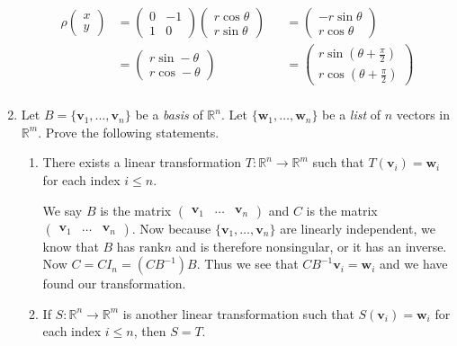 \documentclass[letterpaper]{article}
\newcommand{\rank}{\text{rank}}
\begin{document}
\begin{enumerate}
\begin{align*}
  \rho\left(\begin{array}{c}x\\y\end{array}\right)
  &= \left(\begin{array}{rr}0&-1\\1&0\end{array}\right)
  \left(\begin{array}{r}r\cos\theta\\r\sin\theta\end{array}\right)
  &&=\left(\begin{array}{r}-r\sin\theta\\r\cos\theta\end{array}\right)\\
  &=\left(\begin{array}{r}r\sin-\theta\\r\cos-\theta\end{array}\right)
  &&=\left(\begin{array}{r}r\sin\left(\theta+\frac{\pi}{2}\right)\\r\cos\left(\theta+\frac{\pi}{2}\right)\end{array}\right)\\
\end{align*}
\item
Let $B=\{\mathbf{v}_1,\dots,\mathbf{v}_n\}$ be a \emph{basis} of $\mathbb{R}^n$. Let $\{\mathbf{w}_1,\dots,\mathbf{w}_n\}$ be a \emph{list} of $n$ vectors in $\mathbb{R}^m$. Prove the following statements.
  \begin{enumerate}
  \item
  There exists a linear transformation $T:\mathbb{R}^n\to\mathbb{R}^m$ such that $T(\mathbf{v}_i)=\mathbf{w}_i$ for each index $i\le n$.

  We say $B$ is the matrix $\left(\begin{array}{ccc}\mathbf{v}_1&\dots&\mathbf{v}_n\end{array}\right)$ and $C$ is the matrix $\left(\begin{array}{ccc}\mathbf{v}_1&\dots&\mathbf{v}_n\end{array}\right)$. Now because $\{\mathbf{v}_1,\dots,\mathbf{v}_n\}$ are linearly independent, we know that $B$ has $\rank n$ and is therefore nonsingular, or it has an inverse. Now $C=CI_n=(CB^{-1})B$. Thus we see that $CB^{-1}\mathbf{v}_i=\mathbf{w}_i$ and we have found our transformation.
  \item
  If $S:\mathbb{R}^n\to\mathbb{R}^m$ is another linear transformation such that $S(\mathbf{v}_i)=\mathbf{w}_i$ for each index $i\le n$, then  $S=T$.


\end{enumerate}
\end{enumerate}
\end{document}
